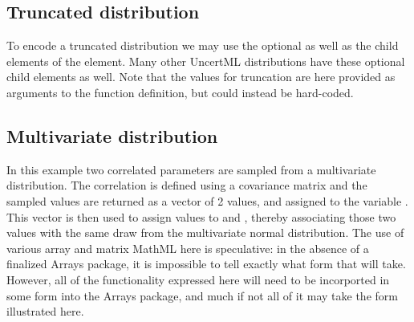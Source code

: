 \documentclass[draftspec]{sbmlpkgspec}
\newcommand{\mathml}{MathML\xspace}
\newcommand{\uncertml}{UncertML\xspace}
\begin{document}
\subsection{Truncated distribution}
\label{sec: truncated-eg}

To encode a truncated distribution we may use the optional  as well as the  child elements of the  element.  Many other \uncertml distributions have these optional child elements as well.  Note that the values for truncation are here provided as arguments to the function definition, but could instead be hard-coded.



\subsection{Multivariate distribution}

In this example two correlated parameters are sampled from a
multivariate distribution. The correlation is defined using a
covariance matrix and the sampled values are returned as a vector of 2
values, and assigned to the variable .  This vector is then used to assign values to  and , thereby associating those two values with the same draw from the multivariate normal distribution.  The use of various array and matrix \mathml here is speculative:  in the absence of a finalized Arrays package, it is impossible to tell exactly what form that will take.  However, all of the functionality expressed here will need to be incorported in some form into the Arrays package, and much if not all of it may take the form illustrated here.




\end{document}
